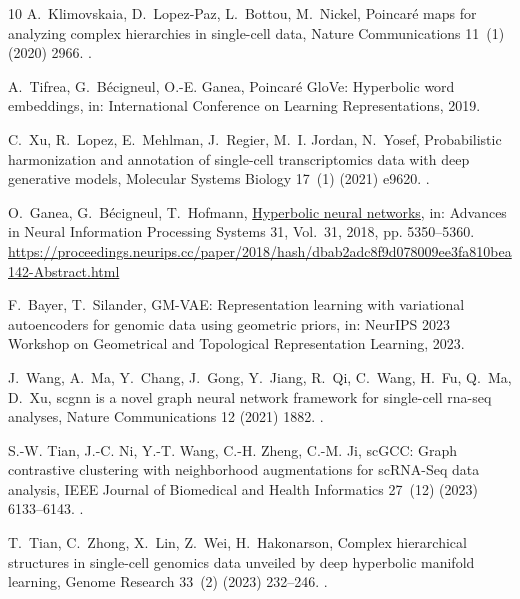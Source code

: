 \documentclass[preprint,12pt]{elsarticle}
\begin{document}
\begin{thebibliography}{10}
A.~Klimovskaia, D.~Lopez-Paz, L.~Bottou, M.~Nickel,
  Poincar{\'e} maps for analyzing complex hierarchies in single-cell data,
  Nature Communications 11~(1) (2020) 2966.
\newblock \href {https://doi.org/10.1038/s41467-020-16822-4}
  {}.

A.~Tifrea, G.~B{\'e}cigneul, O.-E. Ganea,
  Poincar{\'e} {GloVe}: Hyperbolic word embeddings, in: International
  Conference on Learning Representations, 2019.

C.~Xu, R.~Lopez, E.~Mehlman, J.~Regier, M.~I. Jordan, N.~Yosef,
  Probabilistic harmonization and annotation of single-cell transcriptomics
  data with deep generative models, Molecular Systems Biology 17~(1) (2021)
  e9620.
\newblock \href {https://doi.org/10.15252/msb.20209620}
  {}.

O.~Ganea, G.~B{\'e}cigneul, T.~Hofmann,
  \href{https://proceedings.neurips.cc/paper/2018/hash/dbab2adc8f9d078009ee3fa810bea142-Abstract.html}{Hyperbolic
  neural networks}, in: Advances in Neural Information Processing Systems 31,
  Vol.~31, 2018, pp. 5350--5360.
\newline\urlprefix\url{https://proceedings.neurips.cc/paper/2018/hash/dbab2adc8f9d078009ee3fa810bea142-Abstract.html}

F.~Bayer, T.~Silander, {GM-VAE}: Representation learning with variational
  autoencoders for genomic data using geometric priors, in: NeurIPS 2023
  Workshop on Geometrical and Topological Representation Learning, 2023.

J.~Wang, A.~Ma, Y.~Chang, J.~Gong, Y.~Jiang, R.~Qi, C.~Wang, H.~Fu, Q.~Ma,
  D.~Xu, scgnn is a novel graph neural network framework for single-cell
  rna-seq analyses, Nature Communications 12 (2021) 1882.
\newblock \href {https://doi.org/10.1038/s41467-021-22197-x}
  {}.

S.-W. Tian, J.-C. Ni, Y.-T. Wang, C.-H. Zheng, C.-M. Ji, sc{GCC}: Graph
  contrastive clustering with neighborhood augmentations for {scRNA-Seq} data
  analysis, IEEE Journal of Biomedical and Health Informatics 27~(12) (2023)
  6133--6143.
\newblock \href {https://doi.org/10.1109/JBHI.2023.3319551}
  {}.

T.~Tian, C.~Zhong, X.~Lin, Z.~Wei, H.~Hakonarson, Complex hierarchical
  structures in single-cell genomics data unveiled by deep hyperbolic manifold
  learning, Genome Research 33~(2) (2023) 232--246.
\newblock \href {https://doi.org/10.1101/gr.277068.122}
  {}.


\end{thebibliography}
\end{document}
